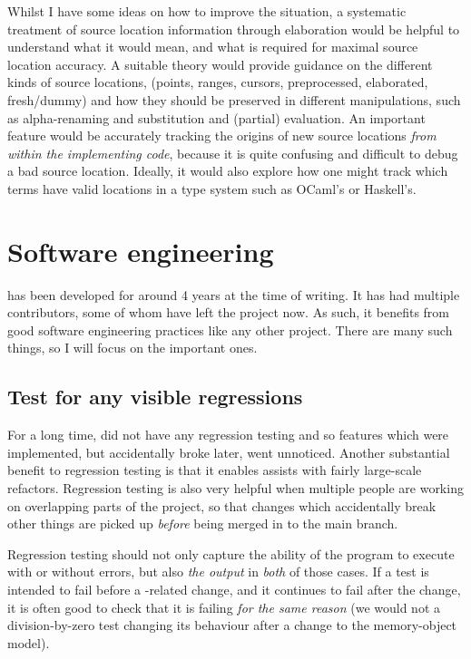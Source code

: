 Whilst I have some ideas on how to improve the situation, a systematic treatment of source location information through
elaboration would be helpful to understand what it would mean, and what is
required for maximal source location accuracy. A suitable theory would provide
guidance on the different kinds of source locations, (points, ranges, cursors,
preprocessed, elaborated, fresh/dummy) and how they should be preserved in
different manipulations, such as alpha-renaming and substitution and (partial)
evaluation. An important feature would be accurately tracking the origins of
new source locations \emph{from within the implementing code}, because it is
quite confusing and difficult to debug a bad source location. Ideally, it would
also explore how one might track which terms have valid locations in a type
system such as OCaml's or Haskell's.

\section{Software engineering}

 has been developed for around 4 years at the time of writing. It has
had multiple contributors, some of whom have left the project now. As such,
it benefits from good software engineering practices like any other project.
There are many such things, so I will focus on the important ones.

\subsection{Test for any visible regressions}

For a long time,  did not have any regression testing and so features
which were implemented, but accidentally broke later, went unnoticed.
Another substantial benefit to regression testing is that it enables assists
with fairly large-scale refactors. Regression testing is also very helpful when
multiple people are working on overlapping parts of the project, so that
changes which accidentally break other things are picked up \emph{before} being
merged in to the main branch.

Regression testing should not only capture the ability of the program to
execute with or without errors, but also \emph{the output} in \emph{both} of
those cases. If a test is intended to fail before a -related change,
and it continues to fail after the change, it is often good to check that it is
failing \emph{for the same reason} (we would not a division-by-zero test
changing its behaviour after a change to the memory-object model).

